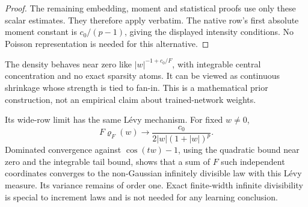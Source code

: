 \begin{proof}
The remaining embedding, moment and statistical proofs use only these scalar estimates. They therefore apply verbatim. The native row's first absolute moment constant is $c_0/(p-1)$, giving the displayed intensity conditions. No Poisson representation is needed for this alternative.
\end{proof}

The density behaves near zero like $|w|^{-1+c_0/F}$, with integrable central concentration and no exact sparsity atoms. It can be viewed as continuous shrinkage whose strength is tied to fan-in. This is a mathematical prior construction, not an empirical claim about trained-network weights.

Its wide-row limit has the same L\'evy mechanism. For fixed $w\ne0$,
\[
 F\varrho_F(w)\longrightarrow
 \frac{c_0}{2|w|(1+|w|)^p}.
\]
Dominated convergence against $\cos(tw)-1$, using the quadratic bound near zero and the integrable tail bound, shows that a sum of $F$ such independent coordinates converges to the non-Gaussian infinitely divisible law with this L\'evy measure. Its variance remains of order one. Exact finite-width infinite divisibility is special to increment laws and is not needed for any learning conclusion.
